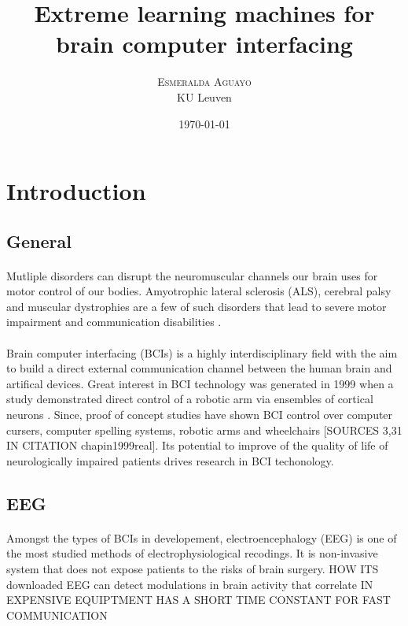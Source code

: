 \documentclass[twoside]{article}
\title{Extreme learning machines for brain computer interfacing} %
\author{%
\textsc{Esmeralda Aguayo} \\[1ex] %
\normalsize KU Leuven \\ %
}
\date{\today} %
\begin{document}
\maketitle


\section{Introduction}
\subsection{General}
\paragraph{}
Mutliple disorders can disrupt the neuromuscular channels our brain uses for motor control of our bodies. Amyotrophic lateral sclerosis (ALS), cerebral palsy and muscular dystrophies are a few of such disorders that lead to severe motor impairment and communication disabilities \citep{wolpaw2002brain}.

\paragraph{}
Brain computer interfacing (BCIs) is a highly interdisciplinary field with the aim to build a direct external communication channel between the human brain and artifical devices. Great interest in BCI technology was generated in 1999 when a study demonstrated direct control of a robotic arm via ensembles of cortical neurons \citep{chapin1999real}. Since, proof of concept studies have shown BCI control over computer cursers, computer spelling systems, robotic arms and wheelchairs [SOURCES 3,31 IN CITATION chapin1999real]. Its potential to improve of the quality of life of neurologically impaired patients drives research in BCI techonology.

\subsection{EEG}
\paragraph{}
Amongst the types of BCIs in developement, electroencephalogy (EEG) is one of the most studied methods of electrophysiological recodings. It is non-invasive system that does not expose patients to the risks of brain surgery. HOW ITS downloaded
EEG can detect modulations in brain activity that correlate
IN EXPENSIVE EQUIPTMENT
HAS A SHORT TIME CONSTANT FOR FAST COMMUNICATION \citep{wolpaw2002brain}
\end{document}
